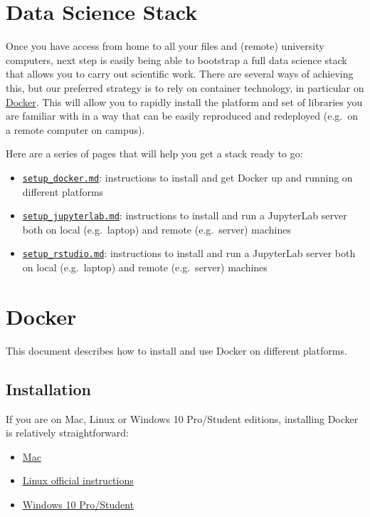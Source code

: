 \documentclass[
]{book}
\providecommand{\tightlist}{%
  \setlength{\itemsep}{0pt}\setlength{\parskip}{0pt}}
\begin{document}
\hypertarget{data-science-stack}{%
\chapter{Data Science Stack}\label{data-science-stack}}

Once you have access from home to all your files and (remote) university computers, next step is easily being able to bootstrap a full data science stack that allows you to carry out scientific work. There are several ways of achieving this, but our preferred strategy is to rely on container technology, in particular on \href{https://www.docker.com/}{Docker}. This will allow you to rapidly install the platform and set of libraries you are familiar with in a way that can be easily reproduced and redeployed (e.g.~on a remote computer on campus).

Here are a series of pages that will help you get a stack ready to go:

\begin{itemize}
\tightlist
\item
  \href{setup_docker.md}{\texttt{setup\_docker.md}}: instructions to install and get Docker
  up and running on different platforms
\item
  \href{setup_jupyterlab.md}{\texttt{setup\_jupyterlab.md}}: instructions to install and
  run a JupyterLab server both on local (e.g.~laptop) and remote (e.g.~server)
  machines
\item
  \href{setup_rstudio.md}{\texttt{setup\_rstudio.md}}: instructions to install and
  run a JupyterLab server both on local (e.g.~laptop) and remote (e.g.~server)
  machines
\end{itemize}

\hypertarget{docker}{%
\chapter{Docker}\label{docker}}

This document describes how to install and use Docker on different platforms.

\hypertarget{installation}{%
\section{Installation}\label{installation}}

If you are on Mac, Linux or Windows 10 Pro/Student editions, installing Docker
is relatively straightforward:

\begin{itemize}
\tightlist
\item
  \href{https://docs.docker.com/docker-for-mac/}{Mac}
\item
  \href{https://docs.docker.com/install/linux/docker-ce/ubuntu/}{Linux official instructions}
\item
  \href{https://docs.docker.com/docker-for-windows/}{Windows 10 Pro/Student}
\end{itemize}
\end{document}
